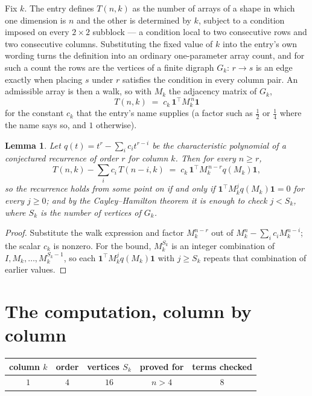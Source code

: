 \documentclass[11pt,a4paper]{article}
\theoremstyle{plain}
\newtheorem{lemma}[theorem]{Lemma}
\theoremstyle{definition}
\begin{document}
Fix $k$. The entry defines $T(n,k)$ as the number of arrays of a shape in which one dimension
is $n$ and the other is determined by $k$, subject to a condition imposed on every
$2\times2$ subblock --- a condition local to two consecutive rows and two consecutive columns.
Substituting the fixed value of $k$ into the entry's own wording turns the definition into an
ordinary one-parameter array count, and for such a count the rows are the vertices of a finite
digraph $G_k$: $r\to s$ is an edge exactly when placing $s$ under $r$ satisfies the condition
in every column pair. An admissible array is then a walk, so with $M_k$ the adjacency matrix
of $G_k$,
\[
T(n,k)\;=\;c_k\,\mathbf{1}^{\!\top}M_k^{\,n}\mathbf{1}
\]
for the constant $c_k$ that the entry's name supplies (a factor such as $\tfrac12$ or
$\tfrac14$ where the name says so, and $1$ otherwise).

\begin{lemma}\label{lem:crit}
Let $q(t)=t^{r}-\sum_i c_it^{r-i}$ be the characteristic polynomial of a conjectured
recurrence of order $r$ for column $k$. Then for every $n\ge r$,
\[
T(n,k)-\sum_i c_i\,T(n-i,k)\;=\;c_k\,\mathbf{1}^{\!\top}M_k^{\,n-r}q(M_k)\mathbf{1},
\]
so the recurrence holds from some point on if and only if
$\mathbf{1}^{\!\top}M_k^{j}q(M_k)\mathbf{1}=0$ for every $j\ge0$; and by the
Cayley--Hamilton theorem it is enough to check $j<S_k$, where $S_k$ is the number of vertices
of $G_k$.
\end{lemma}

\begin{proof}
Substitute the walk expression and factor $M_k^{n-r}$ out of $M_k^{n}-\sum_ic_iM_k^{n-i}$;
the scalar $c_k$ is nonzero. For the bound, $M_k^{S_k}$ is an integer combination of
$I,M_k,\dots,M_k^{S_k-1}$, so each $\mathbf{1}^{\!\top}M_k^{j}q(M_k)\mathbf{1}$ with
$j\ge S_k$ repeats that combination of earlier values.
\end{proof}

\section{The computation, column by column}

\begin{center}
\begin{tabular}{ccccc}
column $k$ & order & vertices $S_k$ & proved for & terms checked \\ \hline
$1$ & $4$ & $16$ & $n>4$ & $8$ \\
\end{tabular}
\end{center}
\end{document}
